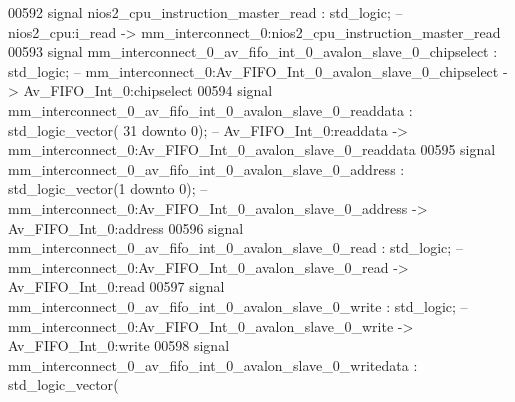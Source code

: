 \begin{DoxyCode}
00592     \textcolor{keywordflow}{signal} \textcolor{vhdlchar}{nios2_cpu_instruction_master_read}                                           \textcolor{vhdlchar}{:} \textcolor{comment}{std\_logic};\textcolor{keyword}{        
                   -- nios2\_cpu:i\_read -> mm\_interconnect\_0:nios2\_cpu\_instruction\_master\_read}
00593     \textcolor{keywordflow}{signal} \textcolor{vhdlchar}{mm_interconnect_0_av_fifo_int_0_avalon_slave_0_chipselect}                   \textcolor{vhdlchar}{:} \textcolor{comment}{std\_logic};\textcolor{keyword}{        
                   -- mm\_interconnect\_0:Av\_FIFO\_Int\_0\_avalon\_slave\_0\_chipselect -> Av\_FIFO\_Int\_0:chipselect}
00594     \textcolor{keywordflow}{signal} \textcolor{vhdlchar}{mm_interconnect_0_av_fifo_int_0_avalon_slave_0_readdata}                     \textcolor{vhdlchar}{:} \textcolor{comment}{std\_logic\_vector}\textcolor{vhdlchar}{(}\textcolor{vhdllogic}{}\textcolor{vhdllogic}{
      31} \textcolor{keywordflow}{downto} \textcolor{vhdllogic}{}\textcolor{vhdllogic}{0}\textcolor{vhdlchar}{)};\textcolor{keyword}{ -- Av\_FIFO\_Int\_0:readdata -> mm\_interconnect\_0:Av\_FIFO\_Int\_0\_avalon\_slave\_0\_readdata}
00595     \textcolor{keywordflow}{signal} \textcolor{vhdlchar}{mm_interconnect_0_av_fifo_int_0_avalon_slave_0_address}                      \textcolor{vhdlchar}{:} \textcolor{comment}{std\_logic\_vector}\textcolor{vhdlchar}{(}\textcolor{vhdllogic}{}\textcolor{vhdllogic}{1}
       \textcolor{keywordflow}{downto} \textcolor{vhdllogic}{}\textcolor{vhdllogic}{0}\textcolor{vhdlchar}{)};\textcolor{keyword}{  -- mm\_interconnect\_0:Av\_FIFO\_Int\_0\_avalon\_slave\_0\_address -> Av\_FIFO\_Int\_0:address}
00596     \textcolor{keywordflow}{signal} \textcolor{vhdlchar}{mm_interconnect_0_av_fifo_int_0_avalon_slave_0_read}                         \textcolor{vhdlchar}{:} \textcolor{comment}{std\_logic};\textcolor{keyword}{        
                   -- mm\_interconnect\_0:Av\_FIFO\_Int\_0\_avalon\_slave\_0\_read -> Av\_FIFO\_Int\_0:read}
00597     \textcolor{keywordflow}{signal} \textcolor{vhdlchar}{mm_interconnect_0_av_fifo_int_0_avalon_slave_0_write}                        \textcolor{vhdlchar}{:} \textcolor{comment}{std\_logic};\textcolor{keyword}{        
                   -- mm\_interconnect\_0:Av\_FIFO\_Int\_0\_avalon\_slave\_0\_write -> Av\_FIFO\_Int\_0:write}
00598     \textcolor{keywordflow}{signal} \textcolor{vhdlchar}{mm_interconnect_0_av_fifo_int_0_avalon_slave_0_writedata}                    \textcolor{vhdlchar}{:} \textcolor{comment}{std\_logic\_vector}\textcolor{vhdlchar}{(}\textcolor{vhdllogic}{}\textcolor{vhdllogic}{
}
\end{DoxyCode}

